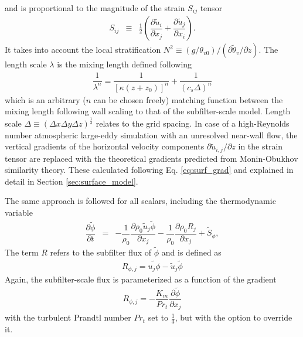 \documentclass[gmd]{copernicus}
\newcommand{\uf}{\ensuremath{\widetilde{u}}}
\newcommand{\thetaf}{\ensuremath{\widetilde{\theta}}}
\newcommand{\phif}{\ensuremath{\widetilde{\phi}}}
\begin{document}
and is proportional to the magnitude of the strain $S_{ij}$ tensor
\begin{eqnarray}
S_{ij} & \equiv & \frac{1}{2} \left( \dfrac{\partial \uf_i}{\partial x_j} + \dfrac{\partial \uf_j}{\partial x_i} \right).
\end{eqnarray}
It takes into account the local stratification $N^2 \equiv (g/\theta_{v0})/(\partial \thetaf_v / \partial z)$. The length scale  $\lambda$ is the mixing length defined following \citet{Mason1992}
\begin{eqnarray}
\dfrac{1}{\lambda^n} = \dfrac{1}{\left[ \kappa \left(z + z_0 \right) \right]^n} + \dfrac{1}{\left( c_s \Delta \right)^n}
\end{eqnarray}
which is an arbitrary ($n$ can be chosen freely) matching function between the mixing length following wall scaling to that of the subfilter-scale model. Length scale $\Delta \equiv (\Delta x \Delta y \Delta z)^\frac{1}{3}$ relates to the grid spacing. In case of a high-Reynolds number atmospheric large-eddy simulation with an unresolved near-wall flow, the vertical gradients of the horizontal velocity components $\partial \uf_{i,j}/\partial z$  in the strain tensor are replaced with the theoretical gradients predicted from Monin-Obukhov similarity theory. These calculated following Eq. \ref{eq:surf_grad} and explained in detail in Section \ref{sec:surface_model}.

The same approach is followed for all scalars, including the thermodynamic variable
\begin{eqnarray}
\dfrac{\partial \phif}{\partial t} & = & - \dfrac{1}{\rho_0} \dfrac{\partial \rho_0 \uf_j \phif}{\partial x_j} - \dfrac{1}{\rho_0} \dfrac{\partial \rho_0 R_j}{\partial x_j} + \widetilde{S}_\phi, \label{eq:consscal_filter}
\end{eqnarray}
The term $R$ refers to the subfilter flux of $\phif$ and is defined as
\begin{eqnarray}
R_{\phi,j} = \widetilde{u_j \phi} - \uf_j \phif
\end{eqnarray}
Again, the subfilter-scale flux is parameterized as a function of the gradient
\begin{eqnarray}
R_{\phi,j} = - \dfrac{K_m}{Pr_t} \dfrac{\partial \phif}{\partial x_j}
\end{eqnarray}
with the turbulent Prandtl number $Pr_t$ set to $\frac{1}{3}$, but with the option to override it.
\end{document}
